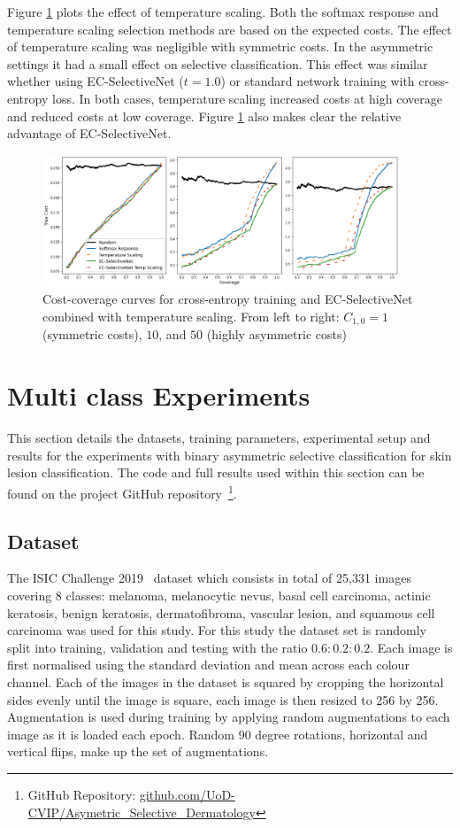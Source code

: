 Figure \ref{fig:temp_scaling} plots the effect of temperature scaling. Both the softmax response and temperature scaling selection methods are based on the expected costs. The effect of temperature scaling was negligible with symmetric costs. In the asymmetric settings it had a small effect on selective classification. This effect was similar whether using EC-SelectiveNet ($t=1.0$) or standard network training with cross-entropy loss. In both cases, temperature scaling increased costs at high coverage and reduced costs at low coverage. Figure \ref{fig:temp_scaling} also makes clear the relative advantage of EC-SelectiveNet.

\begin{figure}[h]
	\centering
	\includegraphics[width=0.95\textwidth]{images/tmp_scaling_v2.png}
	\caption{Cost-coverage curves for cross-entropy training and EC-SelectiveNet combined with temperature scaling. From left to right: $C_{1,0}=1$ (symmetric costs), $10$, and $50$ (highly asymmetric costs)}
	\label{fig:temp_scaling}
\end{figure}

\section{Multi class Experiments}
\label{sec:selective_multi_class_experiments}
This section details the datasets, training parameters, experimental setup and results for the experiments with binary asymmetric selective classification for skin lesion classification. The code and full results used within this section can be found on the project GitHub repository~\footnote{GitHub Repository: \url{github.com/UoD-CVIP/Asymetric_Selective_Dermatology}}.

\subsection{Dataset}
The ISIC Challenge 2019~\citep{codella2018skin,combalia2019csn20000,tschandl2018the} dataset which consists in total of 25,331 images covering 8 classes: melanoma, melanocytic nevus, basal cell carcinoma, actinic keratosis, benign keratosis, dermatofibroma, vascular lesion, and squamous cell carcinoma was used for this study. For this study the dataset set is randomly split into training, validation and testing with the ratio $0.6:0.2:0.2$. Each image is first normalised using the standard deviation and mean across each colour channel. Each of the images in the dataset is squared by cropping the horizontal sides evenly until the image is square, each image is then resized to 256 by 256. Augmentation is used during training by applying random augmentations to each image as it is loaded each epoch. Random 90 degree rotations, horizontal and vertical flips, make up the set of augmentations.

